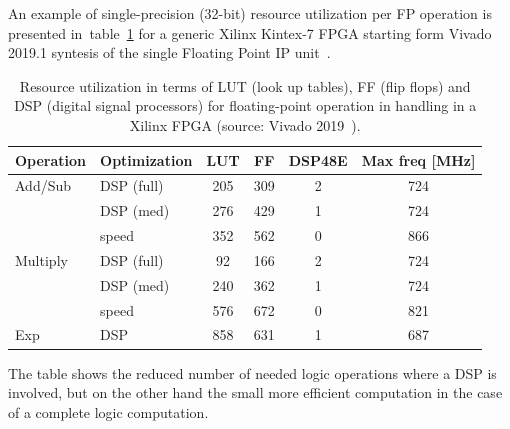 An example of single-precision (32-bit) resource utilization per FP operation is presented in~table~\ref{tab:kintex_fp_resources} for a generic Xilinx Kintex-7 FPGA starting form Vivado 2019.1 syntesis of the single Floating Point IP unit~\cite{ xilinx_FP_v7.1}.
%
\begin{table}[]
    \centering
    \begin{tabular}{l|l|c|c|c|c}
        \textbf{Operation} & \textbf{Optimization} & \textbf{LUT} & \textbf{FF} & \textbf{DSP48E} & \textbf{Max freq [MHz]} \\
        \hline
        Add/Sub   & DSP (full)    & 205 & 309 & 2 & 724 \\
                  & DSP (med)     & 276 & 429 & 1 & 724 \\
                  & speed         & 352 & 562 & 0 & 866 \\
        Multiply  & DSP (full)    & 92  & 166 & 2 & 724 \\
                  & DSP (med)     & 240 & 362 & 1 & 724 \\
                  & speed         & 576 & 672 & 0 & 821 \\      
        Exp       & DSP           & 858 & 631 & 1 & 687 \\
    \end{tabular}
    \caption{Resource utilization in terms of LUT (look up tables), FF (flip flops) and DSP (digital signal processors) for floating-point operation in handling in a Xilinx FPGA (source: Vivado 2019~\cite{xilinx_FP_resources_v2019}).  }
    \label{tab:kintex_fp_resources}
\end{table}
The table shows the reduced number of needed logic operations where a DSP is involved, but on the other hand the small more efficient computation in the case of a complete logic computation.

